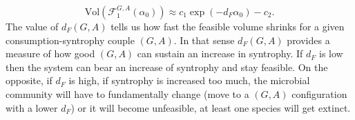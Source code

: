 \documentclass[12pt, titlepage]{report}
\begin{document}
  \begin{equation}
\text{Vol}\left(\mathcal{F}_1^{G,A}(\alpha_0)\right) \approx c_1 \exp{\left(-d_F \alpha_0\right)} - c_2. \label{eq: feasibility results fit feasible volume}
  \end{equation}
  The value of $d_F(G,A)$ tells us how fast the feasible volume shrinks for a given consumption-syntrophy couple $(G,A)$. In that sense $d_F(G,A)$ provides a measure of how good $(G,A)$ can sustain an increase in syntrophy. %
  If $d_F$ is low then the system can bear an increase of syntrophy and stay feasible. On the opposite, if $d_F$ is high, if syntrophy is increased too much, the microbial community will have to fundamentally change (\eg move to a $(G,A)$ configuration with a lower $d_F$) or it will become unfeasible, \ie at least one species will get extinct.
\end{document}
